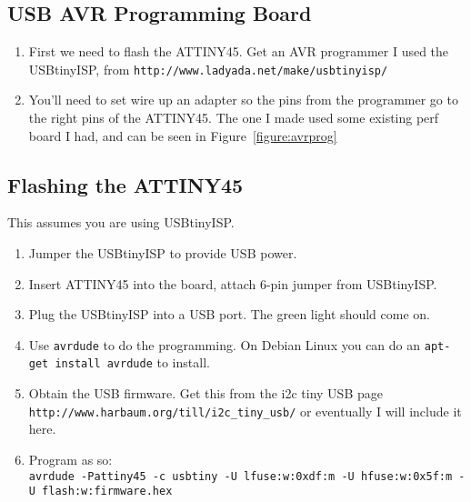 \documentclass[11pt]{article}
\begin{document}
\subsection{USB AVR Programming Board}

\begin{figure*}[tbp]
\begin{center}
\caption{Setup for flashing ATTINY45 with USB-tiny-ISP}
\label{figure:avrprog}
\end{center}
\end{figure*}

\begin{enumerate}
\item First we need to flash the ATTINY45.  Get an AVR programmer
I used the USBtinyISP, from {\tt http://www.ladyada.net/make/usbtinyisp/}
\item You'll need to set wire up an adapter so the pins from the 
programmer go to the right pins of the ATTINY45.  The one I made used
some existing perf board I had, and can be seen in Figure~\ref{figure:avrprog}
\end{enumerate}

\pagebreak

\subsection{Flashing the ATTINY45}

This assumes you are using USBtinyISP.
\begin{enumerate}
\item Jumper the USBtinyISP to provide USB power.
\item Insert ATTINY45 into the board, attach 6-pin jumper
      from USBtinyISP.
\item Plug the USBtinyISP into a USB port.  The green light
      should come on.
\item Use {\tt avrdude} to do the programming.  On Debian Linux
      you can do an {\tt apt-get install avrdude} to install.
\item Obtain the USB firmware.  Get this from the 
      i2c tiny USB page
      {\tt http://www.harbaum.org/till/i2c\_tiny\_usb/} or eventually
      I will include it here.
\item Program as so:\\
      {\tt avrdude -Pattiny45 -c usbtiny -U lfuse:w:0xdf:m 
       -U hfuse:w:0x5f:m -U flash:w:firmware.hex}
\end{enumerate}
\end{document}
